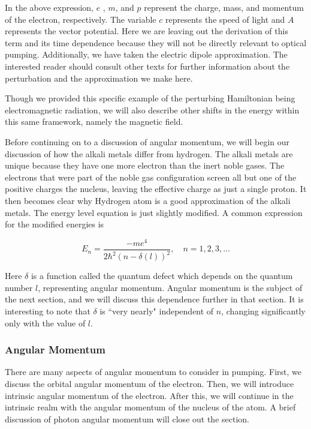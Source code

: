 \documentclass[letter,12pt]{article}
\begin{document}
		In the above expression, $e$ , $m$, and $p$ represent the charge, mass,
		and momentum of the electron, respectively. The variable $c$ represents
		the speed of light and $A$ represents the vector potential. 
		Here we are leaving out the derivation of this term and
		its time dependence because they will not be directly 
		relevant to optical pumping. Additionally, we have taken
		the electric dipole approximation. The interested reader should
		consult other texts for further information about the 
		perturbation and the approximation we make here. 

        Though we provided this specific example of the perturbing 
        Hamiltonian being electromagnetic radiation, we will also 
        describe other shifts in the energy within this same framework,
        namely the magnetic field.

		Before continuing on to a discussion of angular momentum, 
		we will begin our discussion of how the alkali metals differ
		from hydrogen. The alkali metals are unique because they have
        one more electron than the inert noble gases. 
        The electrons that were part of the noble gas configuration 
        screen all but one of the positive charges the nucleus, leaving the effective
        charge as just a single proton. It then becomes clear why Hydrogen 
        atom is a good approximation of the alkali metals. 
        The energy level equation is just slightly modified. A common
        expression for the modified energies is

		\begin{equation}\label{modEnergy}
            E_n=\frac{-me^4}{2\hbar^2(n-\delta(l))^2},\quad n=1,2,3,...
		\end{equation}

        Here $\delta$ is a function called the quantum defect which
        depends on the quantum number $l$, representing angular momentum.
        Angular momentum is the subject of the next section, and we 
        will discuss this dependence further in that section.
        It is interesting to note that $\delta$ is ``very nearly"
        independent of $n$, changing significantly only with 
        the value of $l$.

		\subsubsection{Angular Momentum}\label{angularMomentum}
		There are many aspects of angular momentum to consider
		in pumping. First, we discuss the orbital angular momentum of 
		the electron. Then, we will introduce intrinsic angular momentum
		of the electron. After this, we will continue in the intrinsic 
		realm with the angular momentum of the nucleus of the atom.
		A brief discussion of photon angular momentum will
		close out the section.
\end{document}

